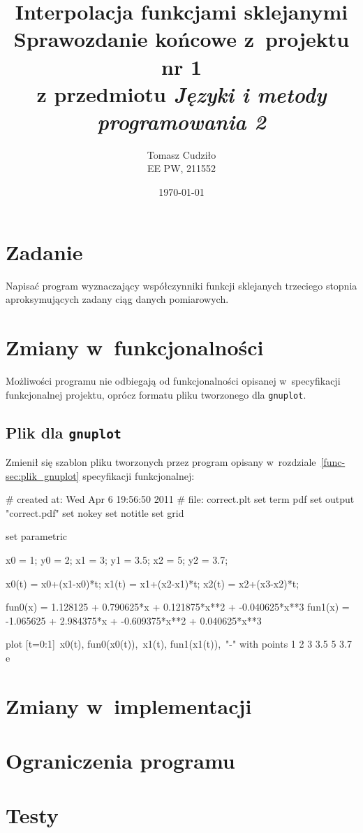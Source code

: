 \documentclass[10pt,a4paper]{article}
\begin{document}
\title{ 
  Interpolacja funkcjami sklejanymi\\
  {\normalsize Sprawozdanie końcowe z~projektu nr 1}\\\vspace{-12pt}
  {\normalsize z przedmiotu \emph{Języki i metody programowania 2}}
}
\author{
  Tomasz Cudziło\\
  {\small EE PW, 211552}
}
\date{\today}
\maketitle

\section*{Zadanie}
\label{sec:zadanie}

Napisać program wyznaczający współczynniki funkcji sklejanych trzeciego stopnia
aproksymujących zadany ciąg danych pomiarowych.

\vspace{24pt}

\section{Zmiany w~funkcjonalności}
Możliwości programu nie odbiegają od funkcjonalności opisanej w~specyfikacji
funkcjonalnej projektu, oprócz formatu pliku tworzonego dla {\tt gnuplot}.

\subsection{Plik dla \texttt{gnuplot}}
Zmienił się szablon pliku tworzonych przez program opisany
w~rozdziale~\ref{func-sec:plik_gnuplot} specyfikacji funkcjonalnej:
\begin{SmallVerbatim}
    # created at: Wed Apr  6 19:56:50 2011
    #       file: correct.plt
    set term pdf
    set output "correct.pdf"
    set nokey
    set notitle
    set grid

    set parametric

    x0 = 1; y0 = 2;
    x1 = 3; y1 = 3.5;
    x2 = 5; y2 = 3.7;

    x0(t) = x0+(x1-x0)*t;
    x1(t) = x1+(x2-x1)*t;
    x2(t) = x2+(x3-x2)*t;

    fun0(x) =   1.128125 +   0.790625*x +   0.121875*x**2 +  -0.040625*x**3
    fun1(x) =  -1.065625 +   2.984375*x +  -0.609375*x**2 +   0.040625*x**3

    plot [t=0:1]\
      x0(t), fun0(x0(t)),\
      x1(t), fun1(x1(t)),\
      "-" with points
        1 2
        3 3.5
        5 3.7
      e
\end{SmallVerbatim}

\section{Zmiany w~implementacji}

\section{Ograniczenia programu}

\section{Testy}
\end{document}
